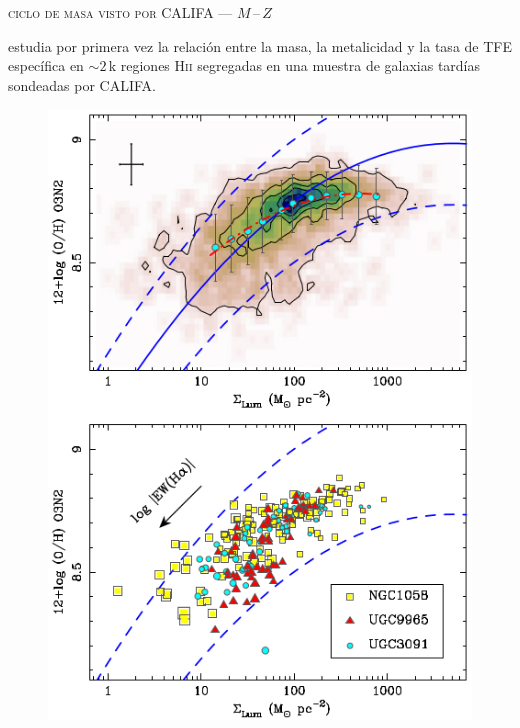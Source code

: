 \documentclass[xcolor=dvipsnames,4pt,hyperref={colorlinks,citecolor=black,linkcolor=black,urlcolor=black}]{beamer}
\begin{document}
\begin{frame}{\textsc{ciclo de masa visto por CALIFA --- $M\,$--$\,Z$}}

\citet{Rosales2012} estudia por primera vez la relación entre la masa, la metalicidad y la tasa de
TFE específica en $\sim2\,$k regiones H\textsc{ii} segregadas en una muestra de galaxias tardías
sondeadas por CALIFA.
\begin{figure}
\includegraphics[scale=1]{img/rosales-ortega2012-1}
\end{figure}
\end{frame}
\end{document}
